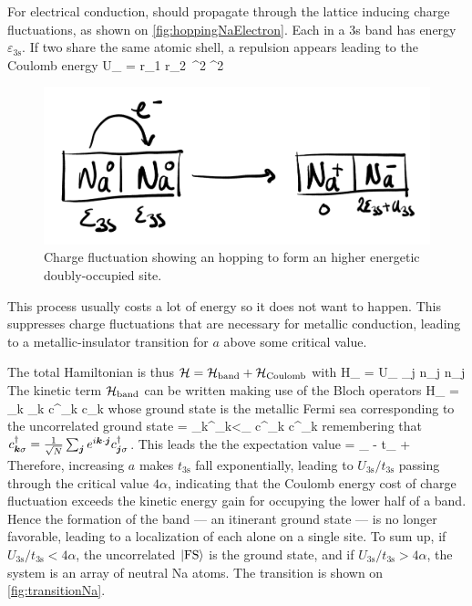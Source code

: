 		For electrical conduction, \electron should propagate through the lattice inducing charge fluctuations, as shown on  \autoref{fig:hoppingNaElectron}. Each \electron in a 3s band has energy $\varepsilon_\text{3s}$. If two share the same atomic shell, a repulsion appears leading to the Coulomb energy
		\be U_ = \int \dd \vb* r_1 \dd \vb* r_2\ ^2  ^2 \ee

		\begin{figure}[h!]
			\centering
			\includegraphics[scale=0.2]{graphs/hoppingNaElectron.png}
			\caption{Charge fluctuation showing an \electron hopping to form an higher energetic doubly-occupied site.}
			\label{fig:hoppingNaElectron}
		\end{figure}

		This process usually costs a lot of energy so it does not want to happen. This suppresses charge fluctuations that are necessary for metallic conduction, leading to a metallic-insulator transition for $a$ above some critical value.

		The total Hamiltonian is thus $\mathcal H = \mathcal H_\text{band} + \mathcal H_\text{Coulomb}$ with
		\be \mc H_ = U_ \sum_{\vb* j} n_{\vb* j \uparrow} n_{\vb* j \downarrow} \ee
		The kinetic term $\mathcal H_\text{band}$ can be written making use of the Bloch operators
		\be \mc H_ = \sum_{\vb* k \sigma} \varepsilon_{\vb* k} c^\dagger_{\vb* k \sigma} c_{\vb* k \sigma} \ee
		whose ground state is the metallic Fermi sea corresponding to the uncorrelated ground state
		\be {} = \prod_{\vb* k}^{\varepsilon_{\vb* k}<\varepsilon_} c^\dagger_{\vb* k \uparrow} c^\dagger_{\vb* k \downarrow}  \ee
		remembering that $ c^\dagger_{\vb* k \sigma} = \frac{1}{\sqrt N} \sum_{\vb* j} e^{i \vb* k \cdot \vb* j} c^\dagger_{\vb* j \sigma}$. This leads the the expectation value
		\be {}  = \varepsilon_ - \alpha t_ +  \ee
		Therefore, increasing $a$ makes $t_\text{3s}$ fall exponentially, leading to $U_\text{3s}/t_\text{3s}$ passing through the critical value $4\alpha$, indicating that the Coulomb energy cost of charge fluctuation exceeds the kinetic energy gain for occupying the lower half of a band. Hence the formation of the band --- an itinerant ground state --- is no longer favorable, leading to a localization of each \electron alone on a single site. To sum up, if $U_\text{3s}/t_\text{3s}< 4\alpha$, the uncorrelated $\ket{\text{FS}}$ is the ground state, and if $U_\text{3s}/t_\text{3s}>4\alpha$, the system is an array of neutral Na atoms. The transition is shown on  \autoref{fig:transitionNa}.
		
